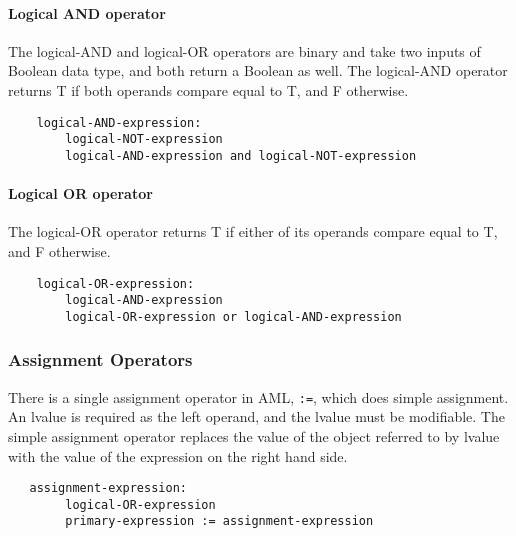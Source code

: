 \documentclass[12pt]{article}
\begin{document}
\paragraph{Logical AND operator}
The logical-AND and logical-OR operators are binary and take two inputs of Boolean data type, and both return a Boolean as well. The logical-AND operator returns T if both operands compare equal to T, and F otherwise.
\begin{lstlisting}
    logical-AND-expression:
        logical-NOT-expression
        logical-AND-expression and logical-NOT-expression
\end{lstlisting}
\paragraph{Logical OR operator}
The logical-OR operator returns T if either of its operands compare equal to T, and F otherwise.
\begin{lstlisting}
    logical-OR-expression:
        logical-AND-expression
        logical-OR-expression or logical-AND-expression
\end{lstlisting}

\subsubsection{Assignment Operators}
There is a single assignment operator in AML, \lstinline{:=}, which does simple assignment. An lvalue is required as the left operand, and the lvalue must be modifiable. The simple assignment operator replaces the value of the object referred to by lvalue with the value of the expression on the right hand side.
\begin{lstlisting}
   assignment-expression:
        logical-OR-expression
        primary-expression := assignment-expression
\end{lstlisting}
\end{document}
